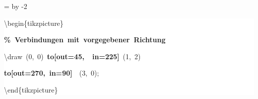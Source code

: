 \begingroup
\ttfamily
{}
=\textwidth
\advance{} by -2\fboxsep
\noindent
\colorbox{background}
{%
\parbox{\dimen255}
{%
\rule[-0.5ex]{0pt}{2.5ex}\hspace*{0.0em}\textbackslash{}begin\{tikzpicture\}\\
\rule[-0.5ex]{0pt}{2.5ex}\hspace*{1.0em}\textcolor{G}{\textbf{\%~Verbindungen~mit~vorgegebener~Richtung}}\\
\rule[-0.5ex]{0pt}{2.5ex}\hspace*{1.0em}\textbackslash{}draw~(0,~0)~\textcolor{R}{\textbf{to[out=45,~~in=225]}}~(1,~2)\\
\rule[-0.5ex]{0pt}{2.5ex}\hspace*{7.5em}\textcolor{R}{\textbf{to[out=270,~in=90]}}~~(3,~0);\\
\rule[-0.5ex]{0pt}{2.5ex}\hspace*{0.0em}\textbackslash{}end\{tikzpicture\}}%
}%
\endgroup
